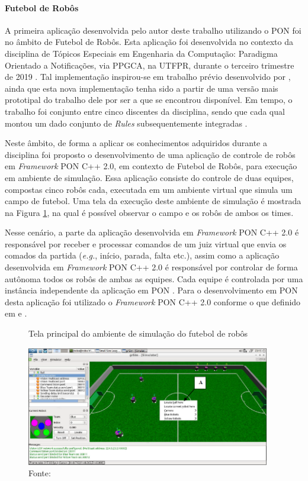 \paragraph{Futebol de Robôs}

A primeira aplicação desenvolvida pelo autor deste trabalho utilizando o PON foi
no âmbito de Futebol de Robôs. Esta aplicação foi desenvolvida no contexto da
disciplina de Tópicos Especiais em Engenharia da Computação: Paradigma Orientado
a Notificações, via PPGCA, na UTFPR, durante o terceiro trimestre de 2019
\cite{lima_2020}. Tal implementação inspirou-se em trabalho prévio desenvolvido
por , ainda que esta nova implementação tenha sido a
partir de uma versão mais prototipal do trabalho dele por ser a que se encontrou
disponível. Em tempo, o trabalho foi conjunto entre cinco discentes da
disciplina, sendo que cada qual montou um dado conjunto de \textit{Rules}
subsequentemente integradas \cite{lima_2020}.

Neste âmbito, de forma a aplicar os conhecimentos adquiridos durante a
disciplina foi proposto o desenvolvimento de uma aplicação de controle de robôs
em \textit{Framework} PON C++ 2.0, em contexto de Futebol de Robôs, para
execução em ambiente de simulação. Essa aplicação consiste do controle de duas
equipes, compostas cinco robôs cada, executada em um ambiente virtual que simula
um campo de futebol. Uma tela da execução deste ambiente de simulação é mostrada
na Figura \ref{fig:futebol_robos}, na qual é possível observar o campo e os
robôs de ambos os times.

Nesse cenário, a parte da aplicação desenvolvida em \textit{Framework} PON C++
2.0 é responsável por receber e processar comandos de um juiz virtual que envia
os comados da partida (\textit{e.g.}, início, parada, falta etc.), assim como a
aplicação desenvolvida em \textit{Framework} PON C++ 2.0 é responsável por
controlar de forma autônoma todos os robôs de ambas as equipes. Cada equipe é
controlada por uma instância independente da aplicação em PON \cite{lima_2020}.
Para o desenvolvimento em PON desta aplicação foi utilizado o \textit{Framework}
PON C++ 2.0 conforme o que definido em  e
. 

\begin{figure}[!htb]
  \centering
  \caption{Tela principal do ambiente de simulação do futebol de robôs}
  \includegraphics[width=0.95\textwidth]{../figures/futebol_robos.png}
  \smallskip
  \caption*{Fonte: }
  \label{fig:futebol_robos}
\end{figure}


